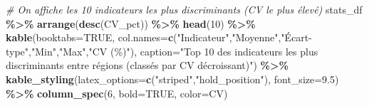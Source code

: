 \documentclass[
]{article}
\newenvironment{Shaded}{\begin{snugshade}}{\end{snugshade}}
\newcommand{\AttributeTok}[1]{\textcolor[rgb]{0.13,0.29,0.53}{#1}}
\newcommand{\CommentTok}[1]{\textcolor[rgb]{0.56,0.35,0.01}{\textit{#1}}}
\newcommand{\ConstantTok}[1]{\textcolor[rgb]{0.56,0.35,0.01}{#1}}
\newcommand{\DecValTok}[1]{\textcolor[rgb]{0.00,0.00,0.81}{#1}}
\newcommand{\FloatTok}[1]{\textcolor[rgb]{0.00,0.00,0.81}{#1}}
\newcommand{\FunctionTok}[1]{\textcolor[rgb]{0.13,0.29,0.53}{\textbf{#1}}}
\newcommand{\NormalTok}[1]{#1}
\newcommand{\SpecialCharTok}[1]{\textcolor[rgb]{0.81,0.36,0.00}{\textbf{#1}}}
\newcommand{\StringTok}[1]{\textcolor[rgb]{0.31,0.60,0.02}{#1}}
\begin{document}
\begin{Shaded}
\begin{Highlighting}[]
\CommentTok{\# On affiche les 10 indicateurs les plus discriminants (CV le plus élevé)}
\NormalTok{stats\_df }\SpecialCharTok{\%\textgreater{}\%}
  \FunctionTok{arrange}\NormalTok{(}\FunctionTok{desc}\NormalTok{(CV\_pct)) }\SpecialCharTok{\%\textgreater{}\%}
  \FunctionTok{head}\NormalTok{(}\DecValTok{10}\NormalTok{) }\SpecialCharTok{\%\textgreater{}\%}
  \FunctionTok{kable}\NormalTok{(}\AttributeTok{booktabs=}\ConstantTok{TRUE}\NormalTok{,}
        \AttributeTok{col.names=}\FunctionTok{c}\NormalTok{(}\StringTok{"Indicateur"}\NormalTok{,}\StringTok{"Moyenne"}\NormalTok{,}\StringTok{"Écart{-}type"}\NormalTok{,}\StringTok{"Min"}\NormalTok{,}\StringTok{"Max"}\NormalTok{,}\StringTok{"CV (\%)"}\NormalTok{),}
        \AttributeTok{caption=}\StringTok{"Top 10 des indicateurs les plus discriminants entre régions (classés par CV décroissant)"}\NormalTok{) }\SpecialCharTok{\%\textgreater{}\%}
  \FunctionTok{kable\_styling}\NormalTok{(}\AttributeTok{latex\_options=}\FunctionTok{c}\NormalTok{(}\StringTok{"striped"}\NormalTok{,}\StringTok{"hold\_position"}\NormalTok{), }\AttributeTok{font\_size=}\FloatTok{9.5}\NormalTok{) }\SpecialCharTok{\%\textgreater{}\%}
  \FunctionTok{column\_spec}\NormalTok{(}\DecValTok{6}\NormalTok{, }\AttributeTok{bold=}\ConstantTok{TRUE}\NormalTok{, }\AttributeTok{color=}\NormalTok{CV)}
\end{Highlighting}
\end{Shaded}

\begingroup\fontsize{9.5}{11.5}\selectfont
\end{document}
